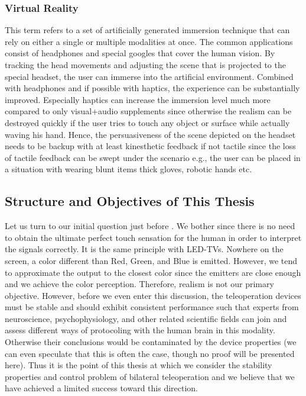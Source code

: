 \subsubsection{Virtual Reality}

This term refers to a set of artificially generated immersion technique that can rely on either a single or multiple modalities at once. The common applications consist of headphones and special googles that cover the human vision. By tracking the head movements and adjusting the scene that is projected to the special headset, the user can immerse into the artificial environment. Combined with headphones and if possible with haptics, the experience can be substantially improved. Especially haptics can increase the immersion level much more compared to only visual+audio supplements since otherwise the realism can be destroyed quickly if the user tries to touch any object or surface while actually waving his hand. Hence, the persuasiveness of the scene depicted on the headset needs to be backup with at least kinesthetic feedback if not tactile since the loss of tactile feedback can be swept under the scenario e.g., the user can be placed in a situation with wearing blunt items thick gloves, robotic hands etc. 



\subsection{Structure and Objectives of This Thesis}
Let us turn to our initial question just before . We bother since there is no need to obtain the ultimate perfect touch sensation for the human in order to interpret the signals correctly. It is the same principle with LED-TVs. Nowhere on the screen, a color different than Red, Green, and Blue is emitted. However, we tend to approximate the output to the closest color since the emitters are close enough and we achieve the color perception. Therefore, realism is not our primary objective. However, before we even enter this discussion, the teleoperation devices must be stable and should exhibit consistent performance such that experts from neuroscience, psychophysiology, and other related scientific fields can join and assess different ways of protocoling with the human brain in this modality. Otherwise their conclusions would be contaminated by the device properties (we can even speculate that this is often the case, though no proof will be presented here). Thus it is the point of this thesis at which we consider the stability properties and control problem of bilateral teleoperation and we believe that we have achieved a limited success toward this direction.



